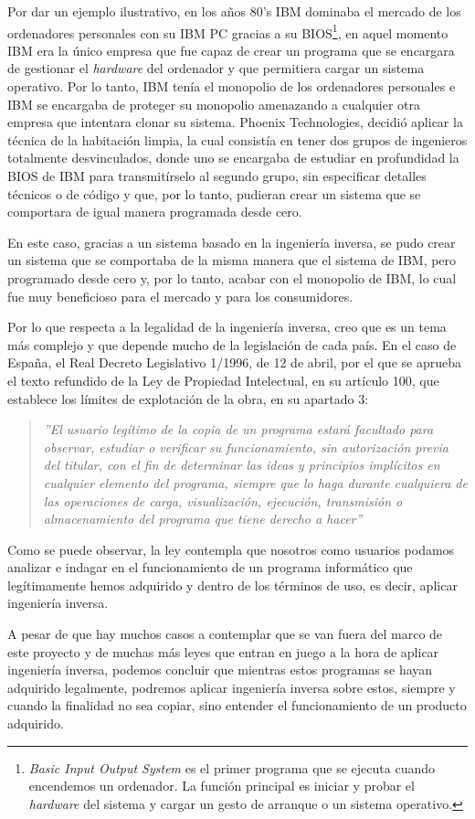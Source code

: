 Por dar un ejemplo ilustrativo, en los años 80's IBM dominaba el mercado de los ordenadores personales
con su IBM PC gracias a su BIOS\footnote{\textit{Basic Input Output System} es el primer programa que se
ejecuta cuando encendemos un ordenador. La función principal es iniciar y probar el \textit{hardware}
del sistema y cargar un gesto de arranque o un sistema operativo.}, en aquel momento IBM era la único empresa
que fue capaz de crear un programa que se encargara de gestionar el \textit{hardware} del ordenador y que
permitiera cargar un sistema operativo. Por lo tanto, IBM tenía el monopolio de los ordenadores personales
e IBM se encargaba de proteger su monopolio amenazando a cualquier otra empresa que intentara clonar su sistema.
Phoenix Technologies, decidió aplicar la técnica de la habitación limpia, la cual consistía en tener dos grupos
de ingenieros totalmente desvinculados, donde uno se encargaba de estudiar en profundidad la BIOS de IBM para
transmitírselo al segundo grupo, sin especificar detalles técnicos o de código y que, por lo tanto, pudieran
crear un sistema que se comportara de igual manera programada desde cero.

En este caso, gracias a un sistema basado en la ingeniería inversa, se pudo crear un sistema que se comportaba
de la misma manera que el sistema de IBM, pero programado desde cero y, por lo tanto, acabar con el monopolio
de IBM, lo cual fue muy beneficioso para el mercado y para los consumidores. \cite{IngenieriaInversa}

Por lo que respecta a la legalidad de la ingeniería inversa, creo que es un tema más complejo y que depende
mucho de la legislación de cada país. En el caso de España, el Real Decreto Legislativo 1/1996, de 12 de abril,
por el que se aprueba el texto refundido de la Ley de Propiedad Intelectual, en su artículo 100, que establece
los límites de explotación de la obra, en su apartado 3:

\begin{quote}
\textit{''El usuario legítimo de la copia de un programa estará facultado para observar, estudiar o
verificar su funcionamiento, sin autorización previa del titular, con el fin de determinar las ideas
y principios implícitos en cualquier elemento del programa, siempre que lo haga durante cualquiera de
las operaciones de carga, visualización, ejecución, transmisión o almacenamiento del programa que tiene
derecho a hacer\cite{LeyPropiedadIntelectual}''}
\end{quote}

Como se puede observar, la ley contempla que nosotros como usuarios podamos analizar e indagar en el funcionamiento
de un programa informático que legítimamente hemos adquirido y dentro de los términos de uso, es decir, aplicar
ingeniería inversa.

A pesar de que hay muchos casos a contemplar que se van fuera del marco de este proyecto y de muchas más leyes
que entran en juego a la hora de aplicar ingeniería inversa, podemos concluir que mientras estos programas se hayan
adquirido legalmente, podremos aplicar ingeniería inversa sobre estos, siempre y cuando la finalidad no sea copiar,
sino entender el funcionamiento de un producto adquirido.
